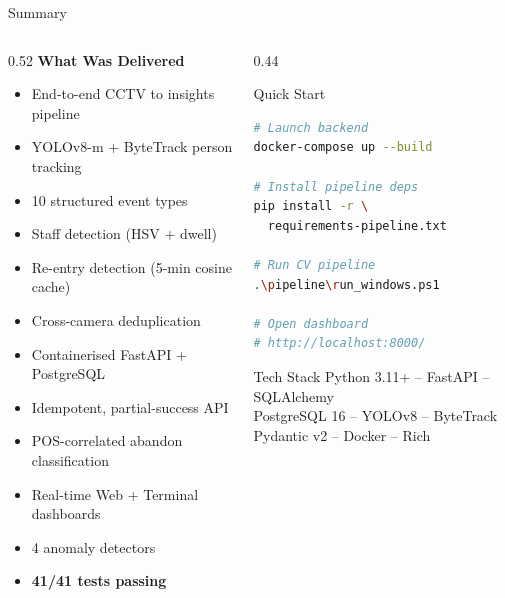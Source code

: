 \documentclass[aspectratio=169, 11pt]{beamer}
\begin{document}
\begin{frame}{Summary}
  \begin{columns}[T]
    \begin{column}{0.52\textwidth}
      \textbf{What Was Delivered}
      \begin{itemize}
        \item End-to-end CCTV to insights pipeline
        \item YOLOv8-m + ByteTrack person tracking
        \item 10 structured event types
        \item Staff detection (HSV + dwell)
        \item Re-entry detection (5-min cosine cache)
        \item Cross-camera deduplication
        \item Containerised FastAPI + PostgreSQL
        \item Idempotent, partial-success API
        \item POS-correlated abandon classification
        \item Real-time Web + Terminal dashboards
        \item 4 anomaly detectors
        \item \textbf{41/41 tests passing}
      \end{itemize}
    \end{column}
    \begin{column}{0.44\textwidth}
      \begin{block}{Quick Start}
\begin{lstlisting}[language=bash, basicstyle=\ttfamily\tiny]
# Launch backend
docker-compose up --build

# Install pipeline deps
pip install -r \
  requirements-pipeline.txt

# Run CV pipeline
.\pipeline\run_windows.ps1

# Open dashboard
# http://localhost:8000/
\end{lstlisting}
      \end{block}

      \vspace{0.2cm}
      \begin{block}{Tech Stack}
        \centering
        \small
        Python 3.11+ -- FastAPI -- SQLAlchemy\\
        PostgreSQL 16 -- YOLOv8 -- ByteTrack\\
        Pydantic v2 -- Docker -- Rich
      \end{block}
    \end{column}
  \end{columns}
\end{frame}
\end{document}
